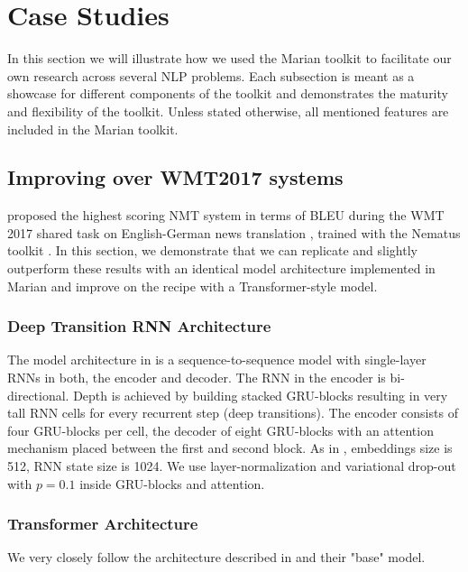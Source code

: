 \documentclass[11pt,a4paper]{article}
\begin{document}
  \section{Case Studies}\label{case}
  In this section we will illustrate how we used the Marian toolkit to facilitate our own research across several NLP problems. 
  Each subsection is meant as a showcase for different components of the toolkit and demonstrates the maturity and flexibility of the toolkit. Unless stated otherwise, all mentioned features are included in the Marian toolkit.  

  \subsection{Improving over WMT2017 systems}

   proposed the highest scoring NMT system in terms of BLEU during the WMT 2017 shared task on English-German news translation \cite{DBLP:conf/wmt/2017}, trained with the Nematus toolkit \cite{sennrich-EtAl:2017:EACLDemo}. In this section, we demonstrate that we can replicate and slightly outperform these results with an identical model architecture implemented in Marian and improve on the recipe with a Transformer-style \cite{NIPS2017_7181} model. 

  \subsubsection{Deep Transition RNN Architecture}

  The model architecture in  is a sequence-to-sequence model with single-layer RNNs in both, the encoder and decoder. The RNN in the encoder is bi-directional. Depth is achieved by building stacked GRU-blocks resulting in very tall RNN cells for every recurrent step (deep transitions). The encoder consists of four GRU-blocks per cell, the decoder of eight GRU-blocks with an attention mechanism placed between the first and second block. As in , embeddings size is 512, RNN state size is 1024. We use layer-normalization \cite{ba2016layer} and variational drop-out with $p=0.1$ \cite{gal2016theoretically} inside GRU-blocks and attention.

  \subsubsection{Transformer Architecture}
  We very closely follow the architecture described in  and their "base" model. 
\end{document}
